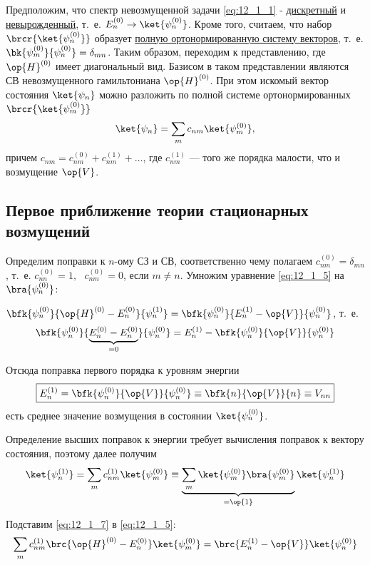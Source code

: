 Предположим, что спектр невозмущенной задачи \eqref{eq:12_1_1} - \underline{дискретный} и \underline{невырожденный}, т.~е. $E_n^{(0)} \to \ket{\psi_n^{(0)}}$. Кроме того, считаем, что набор $\brcr{\ket{\psi_n^{(0)}}}$ образует \underline{полную ортонормированную систему векторов}, т.~е. $\bk{\psi_m^{(0)}}{\psi_n^{(0)}} = \delta_{mn}$. Таким образом, переходим к представлению, где $\op{H}^{(0)}$ имеет диагональный вид. Базисом в таком представлении являются СВ невозмущенного гамильтониана $\op{H}^{(0)}$. При этом искомый вектор состояния $\ket{\psi_n}$ можно разложить по полной системе ортонормированных $\brcr{\ket{\psi_m^{(0)}}}$
$$
\ket{\psi_n}= \sum_m c_{nm} \ket{\psi_m^{(0)}}, 
$$
причем $c_{nm} = c_{nm}^{(0)} + c_{nm}^{(1)} + \dots$, где $c_{nm}^{(1)}$ --- того же порядка малости, что и возмущение $\op{V}$.

\subsection{Первое приближение теории стационарных возмущений}

Определим поправки к $n$-ому СЗ и СВ, соответственно чему полагаем $\boxed{c_{nm}^{(0)} =\delta_{mn}}$, т.~е. $c_{nn}^{(0)} = 1,~~~c_{nm}^{(0)} = 0$, если $m \neq n$. Умножим уравнение \eqref{eq:12_1_5} на $\bra{\psi_n^{(0)}}$:

$\bfk{\psi_n^{(0)}}{\op{H}^{(0)} - E_n^{(0)}}{\psi_n^{(1)}} = \bfk{\psi_n^{(0)}}{E_n^{(1)} - \op{V}}{\psi_n^{(0)}}$, т.~е.
$$
\bfk{\psi_n^{(0)}}{ \underbrace{E_n^{(0)} -  E_n^{(0)}}_{=0}}{\psi_n^{(0)}} = E_n^{(1)} - \bfk{\psi_n^{(0)}}{\op{V}}{\psi_n^{(0)}}
$$

Отсюда поправка первого порядка к уровням энергии
$$
\boxed{E_n^{(1)} = \bfk{\psi_n^{(0)}}{\op{V}}{\psi_n^{(0)}} \equiv \bfk{n}{\op{V}}{n} \equiv V_{nn}}
$$
есть среднее значение возмущения в состоянии $\ket{\psi_n^{(0)}}$.

Определение высших поправок к энергии требует вычисления поправок к вектору состояния, поэтому далее получим
\begin{equation}
\label{eq:12_1_7}
\ket{\psi_n^{(1)}} = \sum_m c_{nm}^{(1)} \ket{\psi_m^{(0)}} \equiv \underbrace{\sum_m \ket{\psi_m^{(0)}} \bra{\psi_m^{(0)}}}_{=\op{1}} \ket{\psi_n^{(1)}}
\end{equation}

Подставим \eqref{eq:12_1_7} в \eqref{eq:12_1_5}:
$$
\sum_m c_{nm}^{(1)} \brc{\op{H}^{(0)} - E_n^{(0)}}\ket{\psi_m^{(0)}} = \brc{E_n^{(1)} - \op{V}}\ket{\psi_n^{(0)}}
$$

